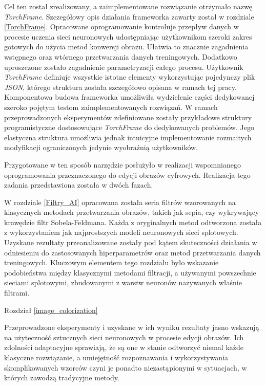 \documentclass[10pt, a4paper, twoside]{article}
\begin{document}
  Cel ten został zrealizowany, a zaimplementowane rozwiązanie otrzymało nazwę
  \textit{TorchFrame}. Szczegółowy opis działania frameworka zawarty został w
  rozdziale \ref{TorchFrame}. Opracowane oprogramowanie kontroluje przepływ danych
  w procesie uczenia sieci neuronowych udostępniając użytkownikom szeroki zakres gotowych do
  użycia metod konwersji obrazu. Ułatwia to znacznie zagadnienia
  wstępnego oraz wtórnego przetwarzania danych treningowych. Dodatkowo uproszczone
  zostało zagadnienie parametryzacji całego procesu. Użytkownik \textit{TorchFrame}
  definiuje wszystkie istotne elementy wykorzystując pojedynczy plik \textit{JSON}, którego
  struktura została szczegółowo opisana w ramach tej pracy. Komponentowa budowa
  frameworka umożliwiła wydzielenie części dedykowanej szeroko pojętym testom
  zaimplementowanych rozwiązań. W ramach przeprowadzonych eksperymentów zdefiniowane
  zostały przykładowe struktury programistyczne dostosowujące \textit{TorchFrame}
  do dedykowanych problemów. Jego elastyczna struktura umożliwia jednak
  intuicyjne implementowanie rozmaitych modyfikacji ograniczonych jedynie
  wyobraźnią użytkowników.

  Przygotowane w ten sposób narzędzie posłużyło w realizacji wspomnianego oprogramowania
  przeznaczonego do edycji obrazów cyfrowych. Realizacja tego zadania przedstawiona
  została w dwóch fazach.

  W rozdziale \ref{Filtry_AI} opracowana została seria filtrów wzorowanych na
  klasycznych metodach przetwarzania obrazów, takich jak sepia, czy wykrywający
  krawędzie filtr Sobela-Feldmana. Każda z oryginalnych metod odtworzona
  została z wykorzystaniem jak najprostszych modeli neuronowych sieci splotowych.
  Uzyskane rezultaty przeanalizowane zostały pod kątem skuteczności działania
  w odniesieniu do zastosowanych hiperparametrów oraz metod przetwarzania danych
  treningowych. Kluczowym elementem tego rozdziału było wskazanie podobieństwa
  między klasycznymi metodami filtracji, a używanymi powszechnie sieciami
  splotowymi, zbudowanymi z warstw neuronów nazywanych właśnie filtrami.

  Rozdział \ref{image_colorization}

  Przeprowadzone eksperymenty i uzyskane w ich wyniku rezultaty jasno
  wskazują na użyteczność sztucznych sieci neuronowych w procesie edycji obrazów.
  Ich zdolności adaptacyjne sprawiają, że są one w stanie odtworzyć niemal każde
  klasyczne rozwiązanie, a umiejętność rozpoznawania i wykorzystywania
  skomplikowanych wzorców czyni je ponadto niezastąpionymi w sytuacjach, w których
  zawodzą tradycyjne metody.
\end{document}
